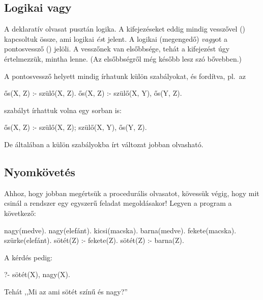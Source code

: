 \subsection*{Logikai vagy}
A deklaratív olvasat pusztán logika. A kifejezéseket
eddig mindig vesszővel (\pr{,}) kapcsoltuk össze,
ami logikai \emph{és}\/t jelent. A logikai
(megengedő) \emph{vagy}\/ot a pontosvessző (\pr{;})
jelöli. A vesszőnek van elsőbbsége, tehát a  kifejezést úgy értelmezzük, mintha
 lenne. (Az elsőbbségről
még később lesz szó bővebben.)\index{\pr{;}}

A pontosvessző helyett mindig írhatunk külön
szabályokat, és fordítva, pl.~az
\begin{program}
ős(X, Z) :- szülő(X, Z).
ős(X, Z) :- szülő(X, Y), ős(Y, Z).
\end{program}
szabályt írhattuk volna egy sorban is:
\begin{program}
ős(X, Z) :- szülő(X, Z); szülő(X, Y), ős(Y, Z).
\end{program}
De általában a külön szabályokba írt változat jobban
olvasható.

\subsection*{Nyomkövetés}
Ahhoz, hogy jobban megértsük a procedurális
olvasatot, kövessük végig, hogy mit csinál a
rendszer egy egyszerű feladat megoldásakor! Legyen a
program a következő:
\begin{program}
nagy(medve).
nagy(elefánt).
kicsi(macska).
barna(medve).
fekete(macska).
szürke(elefánt).
sötét(Z) :- fekete(Z).
sötét(Z) :- barna(Z).
\end{program}

A kérdés pedig:
\begin{query}
?- sötét(X), nagy(X).
\end{query}
Tehát ,,Mi az ami sötét színű és nagy?''

